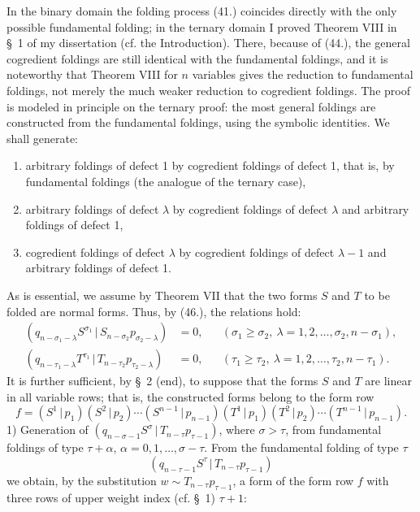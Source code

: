 \documentclass[11pt]{article}
\newcommand{\pair}[2]{(#1\,|\,#2)}
\begin{document}
In the binary domain the folding process (41.) coincides directly with the only possible fundamental folding; in the ternary domain I proved Theorem VIII in \S\ 1 of my dissertation (cf. the Introduction). There, because of (44.), the general cogredient foldings are still identical with the fundamental foldings, and it is noteworthy that Theorem VIII for $n$ variables gives the reduction to fundamental foldings, not merely the much weaker reduction to cogredient foldings. The proof is modeled in principle on the ternary proof: the most general foldings are constructed from the fundamental foldings, using the symbolic identities. We shall generate:
\begin{enumerate}
\item arbitrary foldings of defect 1 by cogredient foldings of defect 1, that is, by fundamental foldings (the analogue of the ternary case),
\item arbitrary foldings of defect $\lambda$ by cogredient foldings of defect $\lambda$ and arbitrary foldings of defect 1,
\item cogredient foldings of defect $\lambda$ by cogredient foldings of defect $\lambda-1$ and arbitrary foldings of defect 1.
\end{enumerate}
As is essential, we assume by Theorem VII that the two forms $S$ and $T$ to be folded are normal forms. Thus, by (46.), the relations hold:
\begin{equation}
\begin{aligned}
\pair{q_{n-\sigma_1-\lambda}S^{\sigma_1}}{S_{n-\sigma_2}p_{\sigma_2-\lambda}}&=0,
&& (\sigma_1\ge\sigma_2,\ \lambda=1,2,\ldots,\sigma_2,n-\sigma_1),\\
\pair{q_{n-\tau_1-\lambda}T^{\tau_1}}{T_{n-\tau_2}p_{\tau_2-\lambda}}&=0,
&& (\tau_1\ge\tau_2,\ \lambda=1,2,\ldots,\tau_2,n-\tau_1).
\end{aligned}
\tag{62}
\end{equation}
It is further sufficient, by \S\ 2 (end), to suppose that the forms $S$ and $T$ are linear in all variable rows; that is, the constructed forms belong to the form row
\[
 f=\pair{S^1}{p_1}\pair{S^2}{p_2}\cdots\pair{S^{n-1}}{p_{n-1}}
   \pair{T^1}{p_1}\pair{T^2}{p_2}\cdots\pair{T^{n-1}}{p_{n-1}}.
\]
1) Generation of $\pair{q_{n-\sigma-1}S^\sigma}{T_{n-\tau}p_{\tau-1}}$, where $\sigma>\tau$, from fundamental foldings of type $\tau+\alpha$, $\alpha=0,1,\ldots,\sigma-\tau$. From the fundamental folding of type $\tau$
\[
 \pair{q_{n-\tau-1}S^\tau}{T_{n-\tau}p_{\tau-1}}
\]
we obtain, by the substitution $w\sim T_{n-\tau}p_{\tau-1}$, a form of the form row $f$ with three rows of upper weight index (cf. \S\ 1) $\tau+1$:
\end{document}
